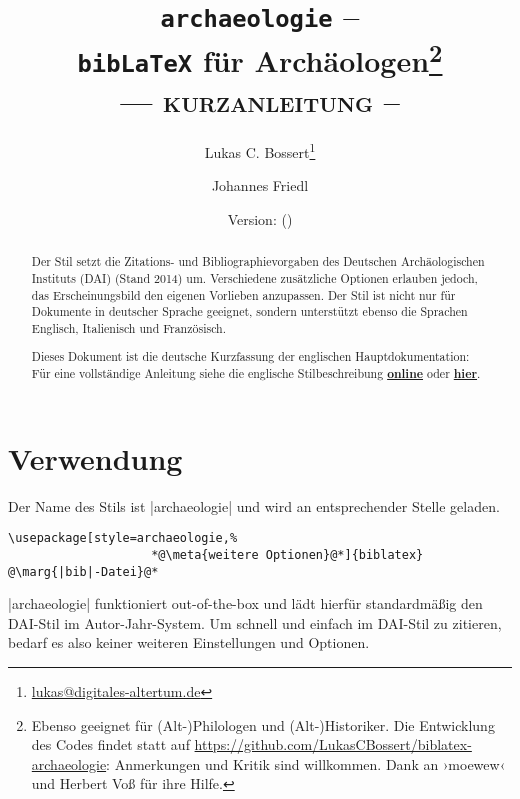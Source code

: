 \documentclass[a4paper,10pt,ngerman]{ltxdoc}
\begin{document}
 \title{\texttt{archaeologie} -- \\\texttt{bib\LaTeX} für Archäologen\footnote{Ebenso geeignet für (Alt-)Philologen und (Alt-)Historiker.
 Die Entwicklung des Codes findet statt auf \url{https://github.com/LukasCBossert/biblatex-archaeologie}: 
 Anmerkungen und Kritik sind willkommen.
 Dank an   ›moewew‹ und Herbert Voß für ihre Hilfe.
}\\ --- {\scshape kurzanleitung} --}
\author{Lukas C. Bossert\thanks{\url{lukas@digitales-altertum.de}} \and Johannes Friedl}
\date{Version: \archaeologieversion{} (\archaeologiedate)} 
 
 \maketitle
 \begin{abstract}
\noindent Der Stil setzt die Zitations- und Bibliographievorgaben des Deutschen Archäologischen Instituts (DAI) (Stand 2014) um. Verschiedene zusätzliche Optionen erlauben jedoch, das Erscheinungsbild den eigenen Vorlieben anzupassen. Der Stil ist nicht nur für Dokumente in deutscher Sprache geeignet, sondern unterstützt ebenso die Sprachen Englisch, Italienisch und Französisch. 

Dieses Dokument ist die deutsche Kurzfassung der englischen Hauptdokumentation: Für eine vollständige Anleitung siehe die englische Stilbeschreibung  \href{http://mirrors.ctan.org/macros/latex/contrib/biblatex-contrib/archaeologie/archaeologie.pdf}{\textbf{online}} oder \href{file:archaeologie.pdf}{\textbf{hier}}.
 \end{abstract}

	{\parskip=0mm \tableofcontents}
\clearpage
\section{Verwendung}
   Der Name des Stils ist |archaeologie| und wird an entsprechender Stelle geladen.

\begin{lstlisting}
\usepackage[style=archaeologie,%
					*@\meta{weitere Optionen}@*]{biblatex}
@\marg{|bib|-Datei}@*
\end{lstlisting}

|archaeologie| funktioniert out-of-the-box und lädt hierfür standardmäßig den DAI-Stil im Autor-Jahr-System. 
Um schnell und einfach im DAI-Stil zu zitieren, bedarf es also keiner weiteren Einstellungen und Optionen. 
\end{document}
